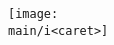 \documentclass[\main/main.tex]{subfiles}
\begin{document}
    \texttt{[image: \\main/i<caret>]}
\end{document}
